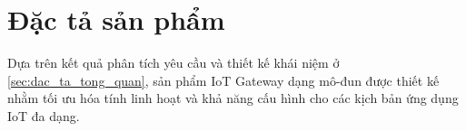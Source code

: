 \section{Đặc tả sản phẩm}

    Dựa trên kết quả phân tích yêu cầu và thiết kế khái niệm ở \autoref{sec:dac_ta_tong_quan}, sản phẩm IoT Gateway dạng mô-đun được thiết kế nhằm tối ưu hóa tính linh hoạt và khả năng cấu hình cho các kịch bản ứng dụng IoT đa dạng.

